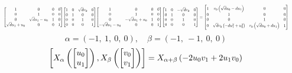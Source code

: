 \documentclass[11pt]{article}
\theoremstyle{definition}
\begin{document}
\[
\scaletoalign{\textwidth}{{\left[\begin{matrix}1 & 0 & 0 & 0\\0 & 1 & 0 & 0\\0 & \sqrt{d} u_{1} - u_{0} & 1 & 0\\\sqrt{d} u_{1} + u_{0} & 0 & 0 & 1\end{matrix}\right]} {\left[\begin{matrix}1 & 0 & \sqrt{d} v_{0} & 0\\0 & 1 & 0 & 0\\0 & 0 & 1 & 0\\0 & 0 & 0 & 1\end{matrix}\right]} {\left[\begin{matrix}1 & 0 & 0 & 0\\0 & 1 & 0 & 0\\0 & - \sqrt{d} u_{1} + u_{0} & 1 & 0\\- \sqrt{d} u_{1} - u_{0} & 0 & 0 & 1\end{matrix}\right]} {\left[\begin{matrix}1 & 0 & - \sqrt{d} v_{0} & 0\\0 & 1 & 0 & 0\\0 & 0 & 1 & 0\\0 & 0 & 0 & 1\end{matrix}\right]} = {\left[\begin{matrix}1 & v_{0} \left(\sqrt{d} u_{0} - d u_{1}\right) & 0 & 0\\0 & 1 & 0 & 0\\0 & 0 & 1 & 0\\0 & \sqrt{d} v_{0} \left(- d u_{1}^{2} + u_{0}^{2}\right) & v_{0} \left(\sqrt{d} u_{0} + d u_{1}\right) & 1\end{matrix}\right]}}
\]
\[
\alpha = \left( -1, \  1, \  0, \  0\right), \quad \beta = \left( -1, \  -1, \  0, \  0\right)
\]
\[
\scaletoalign{\textwidth}{\left[ X_{\alpha}\left(\left[\begin{matrix}u_{0}\\u_{1}\end{matrix}\right]\right), X_{\beta}\left(\left[\begin{matrix}v_{0}\\v_{1}\end{matrix}\right]\right) \right] = X_{\alpha + \beta}\left(- 2 u_{0} v_{1} + 2 u_{1} v_{0}\right)}
\]
\end{document}
